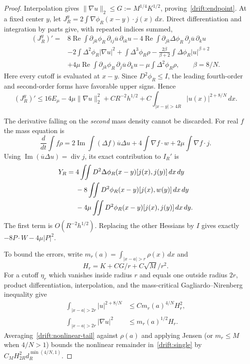 \begin{proof}
Interpolation gives $\|\nabla u\|_2\le G:=M^{1/4}K^{1/2}$, proving~\eqref{drift:endpoint}. At a fixed center $y$, let
$J_R^y=2\int\nabla\phi_R(x-y)\cdot j(x)\,dx$. Direct differentiation and integration by parts give, with repeated indices summed,
\begin{align*}
 (J_R^y)'={}&8\operatorname{Re}\int\partial_{jk}\phi_R\,
                  \partial_{ij}\overline u\,\partial_{ik}u
 -4\operatorname{Re}\int\partial_{jk}\Delta\phi_R\,
                  \partial_j\overline u\,\partial_ku\\
 &-2\int\Delta^2\phi_R|\nabla u|^2+\int\Delta^3\phi_R\rho
 -\frac{2\beta}{\beta+2}\int\Delta\phi_R|u|^{\beta+2}\\
 &+4\mu\operatorname{Re}\int\partial_{jk}\phi_R\,
                    \partial_j\overline u\,\partial_ku
 -\mu\int\Delta^2\phi_R\rho,
 \qquad\beta=8/N.
\end{align*}
Here every cutoff is evaluated at $x-y$. Since $D^2\phi_R\le I$, the leading fourth-order and second-order forms have favorable upper signs. Hence
\begin{equation}\label{drift:single}
 (J_R^y)'\le16E_\mu-4\mu\|\nabla u\|_2^2
       +C R^{-2}h^{1/2}
       +C\int_{|x-y|>4R}|u(x)|^{2+8/N}\,dx.
\end{equation}

The derivative falling on the \emph{second} mass density cannot be discarded. For real $f$ the mass equation is
\begin{equation}\label{drift:mass}
 \frac{d}{dt}\int f\rho
 =2\operatorname{Im}\int(\Delta f)\overline u\Delta u
  +4\int\nabla f\cdot w+2\mu\int\nabla f\cdot j.
\end{equation}
Using $\operatorname{Im}(\overline u\Delta u)=\operatorname{div}j$, its exact contribution to $I_R'$ is
\begin{align}
 Y_R={}&4\iint D^2\Delta\phi_R(x-y)[j(x),j(y)]\,dx\,dy\notag\\
 &-8\iint D^2\phi_R(x-y)[j(x),w(y)]\,dx\,dy\notag\\
 &-4\mu\iint D^2\phi_R(x-y)[j(x),j(y)]\,dx\,dy.
 \label{drift:second-density}
\end{align}
The first term is $O(R^{-2}h^{1/2})$. Replacing the other Hessians by $I$ gives exactly $-8P\cdot W-4\mu|P|^2$.

To bound the errors, write $m_r(a)=\int_{|x-a|>r}\rho(x)\,dx$ and
\[
 H_r=K+C G/r+C\sqrt M/r^2.
\]
For a cutoff $\eta_r$ which vanishes inside radius $r$ and equals one outside radius $2r$, product differentiation, interpolation, and the mass-critical Gagliardo--Nirenberg inequality give
\begin{align}
 \int_{|x-a|>2r}|u|^{2+8/N}&\le C m_r(a)^{4/N}H_r^2,
 \label{drift:nonlinear-tail}\\
 \int_{|x-a|>2r}|\nabla u|^2&\le m_r(a)^{1/2}H_r.
 \label{drift:gradient-tail}
\end{align}
Averaging~\eqref{drift:nonlinear-tail} against $\rho(a)$ and applying Jensen (or $m_r\le M$ when $4/N>1$) bounds the nonlinear remainder in~\eqref{drift:single} by
$C_MH_{2R}^2d_R^{\min(4/N,1)}$.


\end{proof}

